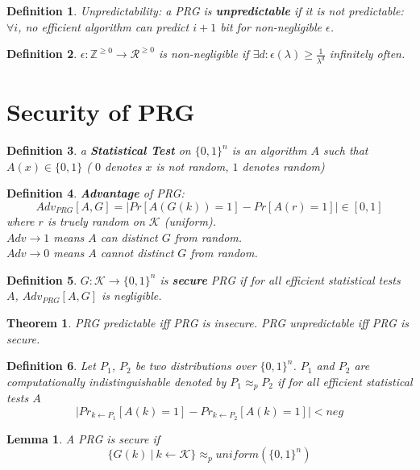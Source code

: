 \documentclass[12pt]{book}
\newtheorem{mydef}{Definition}
\newtheorem{mylemma}{Lemma}
\newtheorem{mythm}{Theorem}
\newcommand{\mk}{\mathcal{K}}
\newcommand{\mr}{\mathcal{R}}
\newcommand{\bs}[1]{\{0, 1\}^#1}
\newcommand{\abs}{\bigg\vert}
\begin{document}
\begin{mydef}
 Unpredictability: a PRG is \textbf{unpredictable} if it is not predictable: $\forall i$, no efficient algorithm can predict $i+1$ bit for non-negligible $\epsilon$.
\end{mydef}

\begin{mydef}
 $\epsilon: \mathbb{Z}^{\geq 0} \rightarrow {\mr}^{\geq 0}$ is non-negligible if $\exists d: \epsilon(\lambda) \geq \frac{1}{\lambda^d}$ infinitely often.
\end{mydef}

\section{Security of PRG}

\begin{mydef}
	a \textbf{Statistical Test} on $\bs{n}$ is an algorithm $A$ such that $A(x) \in \{0,1\} $ ( $0$ denotes $x$ is not random, $1$ denotes random) 
\end{mydef}

\begin{mydef}
	\textbf{Advantage} of PRG:
	$$Adv_{PRG}[A, G] = \abs Pr[A(G(k))=1] - Pr[A(r)=1] \abs \in [0,1]$$
	where $r$ is truely random on $\mk$ (uniform). \\
	$Adv \rightarrow 1$ means $A$ can distinct $G$ from random.\\
	$Adv \rightarrow 0$ means $A$ cannot distinct $G$ from random.
\end{mydef}

\begin{mydef}
	$G:\mk \rightarrow \bs{n}$ is \textbf{secure} PRG if for all efficient statistical tests $A$, $Adv_{PRG}[A,G]$ is negligible.
\end{mydef}

\begin{mythm}
	PRG predictable iff PRG is insecure. PRG unpredictable iff PRG is secure.
\end{mythm}

\begin{mydef}
	Let $P_1$, $P_2$ be two distributions over $\bs{n}$. $P_1$ and $P_2$ are computationally indistinguishable denoted by $P_1 \approx_p P_2$ if for all efficient statistical tests $A$
	$$\abs Pr_{k \leftarrow P_1}[A(k)=1] - Pr_{k \leftarrow P_2}[A(k)=1]\abs < neg$$
\end{mydef}

\begin{mylemma}
	A PRG is secure if $$\{ G(k)\ \vert \ k \leftarrow \mk\} \approx_p uniform(\bs{n})$$
\end{mylemma}
\end{document}
